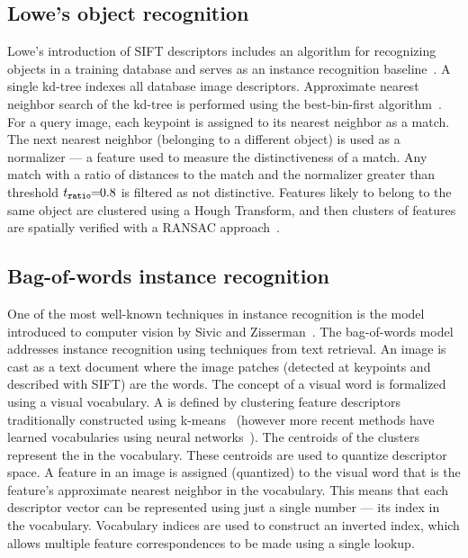         \figSVInlier{}

        \FloatBarrier{}

    \subsection{Lowe's object recognition}

        Lowe's introduction of SIFT descriptors includes an algorithm for recognizing objects in a training
        database and serves as an instance recognition baseline~\cite{lowe_distinctive_2004}. A single kd-tree
        indexes all database image descriptors. Approximate nearest neighbor search of the kd-tree is performed
        using the best-bin-first algorithm~\cite{beis_shape_1997}. For a query image, each keypoint is assigned to
        its nearest neighbor as a match. The next nearest neighbor (belonging to a different object) is used as a
        normalizer --- a feature used to measure the distinctiveness of a match. Any match with a ratio of
        distances to the match and the normalizer greater than threshold $t_{\tt{ratio}} \mkern-6mu=\mkern-6mu 0.8$ is filtered as
        not distinctive. Features likely to belong to the same object are clustered using a Hough Transform, and
        then clusters of features are spatially verified with a RANSAC approach~\cite{fischler_random_1981}.


    \subsection{Bag-of-words instance recognition}\label{subsec:bow}

        One of the most well-known techniques in instance recognition is the  model
        introduced to computer vision by Sivic and Zisserman~\cite{sivic_video_2003, sivic_efficient_2009}. The
        bag-of-words model addresses instance recognition using techniques from text retrieval. An image is cast as
        a text document where the image patches (detected at keypoints and described with SIFT) are the words. The
        concept of a visual word is formalized using a visual vocabulary. A  is
        defined by clustering feature descriptors traditionally constructed using k-means~\cite{lloyd_least_1982}
        (however more recent methods have learned vocabularies using neural
        networks~\cite{arandjelovic_netvlad_2016}). The centroids of the clusters represent the  in the vocabulary. These centroids are used to quantize descriptor space. A feature in an image is
        assigned (quantized) to the visual word that is the feature's approximate nearest neighbor in the
        vocabulary. This means that each descriptor vector can be represented using just a single number --- \ie{}
        its index in the vocabulary. Vocabulary indices are used to construct an inverted index, which allows
        multiple feature correspondences to be made using a single lookup.

